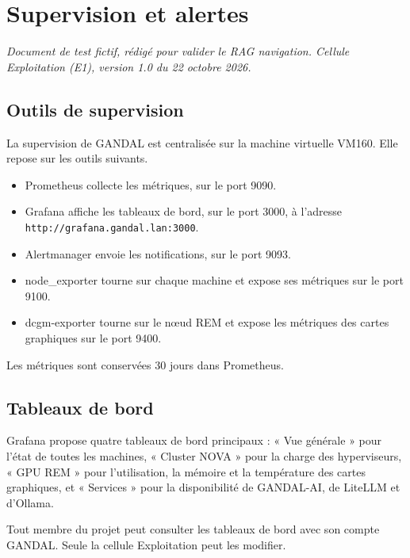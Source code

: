 \documentclass[11pt,a4paper]{report}
\begin{document}
\chapter{Supervision et alertes}

\emph{Document de test fictif, rédigé pour valider le RAG navigation. Cellule Exploitation (E1), version 1.0 du 22 octobre 2026.}

\section{Outils de supervision}
La supervision de GANDAL est centralisée sur la machine virtuelle VM160. Elle repose sur les outils suivants.

\begin{itemize}
\item Prometheus collecte les métriques, sur le port 9090.
\item Grafana affiche les tableaux de bord, sur le port 3000, à l'adresse \texttt{http://grafana.gandal.lan:3000}.
\item Alertmanager envoie les notifications, sur le port 9093.
\item node\_exporter tourne sur chaque machine et expose ses métriques sur le port 9100.
\item dcgm-exporter tourne sur le nœud REM et expose les métriques des cartes graphiques sur le port 9400.
\end{itemize}

Les métriques sont conservées 30 jours dans Prometheus.

\section{Tableaux de bord}
Grafana propose quatre tableaux de bord principaux : « Vue générale » pour l'état de toutes les machines, « Cluster NOVA » pour la charge des hyperviseurs, « GPU REM » pour l'utilisation, la mémoire et la température des cartes graphiques, et « Services » pour la disponibilité de GANDAL-AI, de LiteLLM et d'Ollama.

Tout membre du projet peut consulter les tableaux de bord avec son compte GANDAL. Seule la cellule Exploitation peut les modifier.
\end{document}

